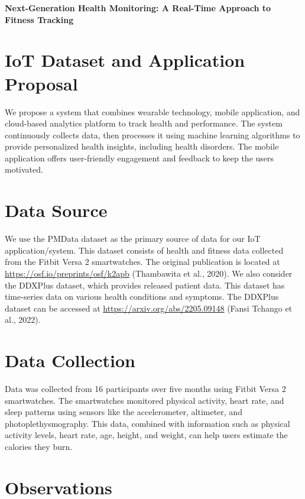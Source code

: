 \documentclass[10pt]{extarticle}
\begin{document}

\begin{center}
    {\LARGE \textbf{Next-Generation Health Monitoring: A Real-Time Approach to Fitness Tracking}}
\end{center}

\section{IoT Dataset and Application Proposal}

We propose a system that combines wearable technology, mobile application, and cloud-based analytics platform to track health and performance. The system continuously collects data, then processes it using machine learning algorithms to provide personalized health insights, including health disorders. The mobile application offers user-friendly engagement and feedback to keep the users motivated.

\section{Data Source}

We use the PMData dataset as the primary source of data for our IoT application/system. This dataset consists of health and fitness data collected from the Fitbit Versa 2 smartwatches. The original publication is located at \url{https://osf.io/preprints/osf/k2apb} (Thambawita et al., 2020). We also consider the DDXPlus dataset, which provides released patient data. This dataset has time-series data on various health conditions and symptoms. The DDXPlus dataset can be accessed at \url{https://arxiv.org/abs/2205.09148} (Fansi Tchango et al., 2022).

\section{Data Collection}

Data was collected from 16 participants over five months using Fitbit Versa 2 smartwatches. The smartwatches monitored physical activity, heart rate, and sleep patterns using sensors like the accelerometer, altimeter, and photoplethysmography. This data, combined with information such as physical activity levels, heart rate, age, height, and weight, can help users estimate the calories they burn.

\section{Observations}
\end{document}
